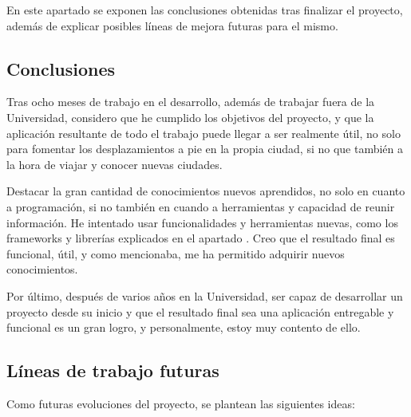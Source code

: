 
En este apartado se exponen las conclusiones obtenidas tras finalizar el proyecto, además de explicar posibles líneas de mejora futuras para el mismo.

\subsection{Conclusiones}
Tras ocho meses de trabajo en el desarrollo, además de trabajar fuera de la Universidad, considero que he cumplido los objetivos del proyecto, y que la aplicación resultante de todo el trabajo puede llegar a ser realmente útil, no solo para fomentar los desplazamientos a pie en la propia ciudad, si no que también a la hora de viajar y conocer nuevas ciudades.


Destacar la gran cantidad de conocimientos nuevos aprendidos, no solo en cuanto a programación, si no también en cuando a herramientas y capacidad de reunir información. He intentado usar funcionalidades y herramientas nuevas, como los frameworks y librerías explicados en el apartado . Creo que el resultado final es funcional, útil, y como mencionaba, me ha permitido adquirir nuevos conocimientos.


Por último, después de varios años en la Universidad, ser capaz de desarrollar un proyecto desde su inicio y que el resultado final sea una aplicación entregable y funcional es un gran logro, y personalmente, estoy muy contento de ello.


\subsection{Líneas de trabajo futuras}\label{futuras}
Como futuras evoluciones del proyecto, se plantean las siguientes ideas:

